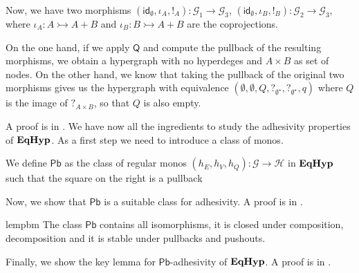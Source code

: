 \documentclass[3p]{elsarticle}
\newcommand{\pbc}{\mathsf{Pb}}
\newcommand{\quo}{\mathsf{Q}}
\newcommand{\catname}[1]{\textbf{\textup{#1}}}
\newcommand{\EqHyp}{\catname{EqHyp}} %
\newcommand{\mto}{\rightarrowtail}
\newcommand{\id}[1]{\mathsf{id}_{#1}}
\theoremstyle{remark}
\theoremstyle{definition}
\begin{document}
{\begin{exa}
Now, we have two morphisms $(\id{\emptyset}, \iota_A, !_A)\colon \mathcal{G}_1 \to \mathcal{G}_3$,  $(\id{\emptyset}, \iota_B, !_B)\colon  \mathcal{G}_2 \to \mathcal{G}_3$, where $\iota_A\colon A\mto A+B$  and $\iota_B\colon B \mto A+B$  are the coprojections.

On the one hand, if we apply $\quo$ and compute the pullback of the resulting morphisms, we obtain a hypergraph with no hyperdeges and $A\times B$ as set of nodes. On the other hand,  we know that taking the pullback of the original two morphisms gives us the hypergraph with equivalence $(\emptyset, \emptyset, Q, ?_{\emptyset^\star}, ?_{\emptyset^\star}, q)$ where $Q$ is the image of $?_{A\times B}$, so that $Q$ is also empty.  
\end{exa}
}

A proof is in .
We have now all the ingredients to study the adhesivity properties of $\EqHyp$.  As a first step we need to introduce a class of monos.

\noindent
\begin{minipage}[l]{.83\linewidth}
\begin{defi}
	We define $\pbc$ as the class of  regular monos $(h_E, h_V, h_Q)\colon \mathcal{G}\to \mathcal{H}$ in $\EqHyp$ such that the square on the right is a pullback
\end{defi}
\end{minipage} \hfill 
\begin{minipage}[r]{.15\linewidth}
 \end{minipage}

\vspace{.1cm}
Now, we show that $\pbc$ is a suitable class for adhesivity. A proof is in .

\begin{restatable}{lem}{pbm}\label{lem:pbmono}
	The class $\pbc$ contains all isomorphisms, it is closed under composition, decomposition and it is stable under pullbacks and pushouts.
\end{restatable}

\vspace{.1cm}
Finally, we show the key lemma for $\pbc$-adhesivity of $\EqHyp$. A proof is in .
\end{document}
